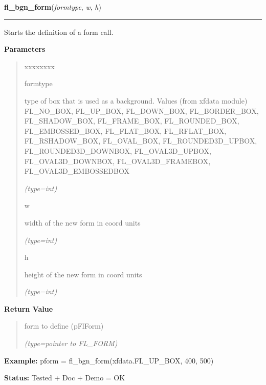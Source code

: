 \hspace{.8\funcindent}\begin{boxedminipage}{\funcwidth}

    \raggedright \textbf{fl\_bgn\_form}(\textit{formtype}, \textit{w}, \textit{h})

    \vspace{-1.5ex}

    \rule{\textwidth}{0.5\fboxrule}
\setlength{\parskip}{2ex}
    Starts the definition of a form call.

\setlength{\parskip}{1ex}
      \textbf{Parameters}
      \vspace{-1ex}

      \begin{quote}
        \begin{Ventry}{xxxxxxxx}

          \item[formtype]

          type of box that is used as a background. Values (from xfdata 
          module) FL\_NO\_BOX, FL\_UP\_BOX, FL\_DOWN\_BOX, FL\_BORDER\_BOX,
          FL\_SHADOW\_BOX, FL\_FRAME\_BOX, FL\_ROUNDED\_BOX, 
          FL\_EMBOSSED\_BOX, FL\_FLAT\_BOX, FL\_RFLAT\_BOX, 
          FL\_RSHADOW\_BOX, FL\_OVAL\_BOX, FL\_ROUNDED3D\_UPBOX, 
          FL\_ROUNDED3D\_DOWNBOX, FL\_OVAL3D\_UPBOX, FL\_OVAL3D\_DOWNBOX, 
          FL\_OVAL3D\_FRAMEBOX, FL\_OVAL3D\_EMBOSSEDBOX

            {\it (type=int)}

          \item[w]

          width of the new form in coord units

            {\it (type=int)}

          \item[h]

          height of the new form in coord units

            {\it (type=int)}

        \end{Ventry}

      \end{quote}

      \textbf{Return Value}
    \vspace{-1ex}

      \begin{quote}
      form to define (pFlForm)

      {\it (type=pointer to FL\_FORM)}

      \end{quote}

\textbf{Example:} pform = fl\_bgn\_form(xfdata.FL\_UP\_BOX, 400, 500)



\textbf{Status:} Tested + Doc + Demo = OK



    \end{boxedminipage}

